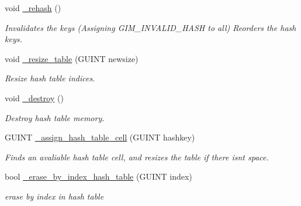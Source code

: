 \begin{DoxyCompactItemize}
void \hyperlink{classgim__hash__table_aa33115e75d8cc5c489fa6ce8b1a23654}{\+\_\+rehash} ()
\begin{DoxyCompactList}\small\item\em Invalidates the keys (Assigning G\+I\+M\+\_\+\+I\+N\+V\+A\+L\+I\+D\+\_\+\+H\+A\+SH to all) Reorders the hash keys. \end{DoxyCompactList}\item 
\mbox{\label{classgim__hash__table_a51905040dee4c41954f5de1634c090dd}} 
void \hyperlink{classgim__hash__table_a51905040dee4c41954f5de1634c090dd}{\+\_\+resize\+\_\+table} (G\+U\+I\+NT newsize)
\begin{DoxyCompactList}\small\item\em Resize hash table indices. \end{DoxyCompactList}\item 
\mbox{\label{classgim__hash__table_a2b7a2b3eb817edf8af93a85ce910a5ca}} 
void \hyperlink{classgim__hash__table_a2b7a2b3eb817edf8af93a85ce910a5ca}{\+\_\+destroy} ()
\begin{DoxyCompactList}\small\item\em Destroy hash table memory. \end{DoxyCompactList}\item 
\mbox{\label{classgim__hash__table_a93e5bf5c573a39e21e9bd0a4aec38e1a}} 
G\+U\+I\+NT \hyperlink{classgim__hash__table_a93e5bf5c573a39e21e9bd0a4aec38e1a}{\+\_\+assign\+\_\+hash\+\_\+table\+\_\+cell} (G\+U\+I\+NT hashkey)
\begin{DoxyCompactList}\small\item\em Finds an avaliable hash table cell, and resizes the table if there isn\textquotesingle{}t space. \end{DoxyCompactList}\item 
\mbox{\label{classgim__hash__table_afbaacd523281706f94476ae60917856e}} 
bool \hyperlink{classgim__hash__table_afbaacd523281706f94476ae60917856e}{\+\_\+erase\+\_\+by\+\_\+index\+\_\+hash\+\_\+table} (G\+U\+I\+NT index)
\begin{DoxyCompactList}\small\item\em erase by index in hash table \end{DoxyCompactList}\item 
\mbox{\label{classgim__hash__table_af03ef67dcf7b0e805e34df6a5de4425f}} 

\end{DoxyCompactItemize}
